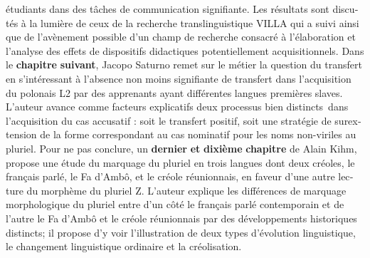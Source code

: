 \documentclass[output=paper]{langscibook}
\begin{document}
\begin{otherlanguage}{french}
étudiants dans des tâches de communication signifiante. Les résultats sont discutés à la lumière de ceux de la recherche translinguistique VILLA qui a suivi ainsi que de l’avènement possible d’un champ de recherche consacré à l’élaboration et l’analyse des effets de dispositifs didactiques potentiellement acquisitionnels. Dans le {\textbf{chapitre} \textbf{suivant}}, Jacopo Saturno remet sur le métier la question du transfert en s’intéressant à l’absence non moins signifiante de transfert dans l’acquisition du polonais L2 par des apprenants ayant différentes langues premières slaves.  {L’auteur avance} comme facteurs explicatifs deux processus bien distincts~dans l’acquisition du cas accusatif : soit le transfert positif, soit une stratégie de surextension de la forme correspondant au cas nominatif pour les noms non-viriles au pluriel.
Pour ne pas conclure, un {\textbf{dernier} \textbf{et} \textbf{dixième} \textbf{chapitre}} de Alain Kihm, propose une étude du marquage du pluriel en trois langues dont deux créoles, le français parlé, le Fa d’Ambô, et le créole réunionnais, en faveur d’une autre lecture du morphème du pluriel Z. L’auteur explique les différences de marquage morphologique du pluriel entre d'un côté le français parlé contemporain et de l'autre le Fa d’Ambô et le créole réunionnais par des développements historiques distincts; il propose d'y voir l'illustration de deux types d'évolution linguistique, le changement linguistique ordinaire et la créolisation.

\printbibliography[heading=subbibliography,notkeyword=this]
\end{otherlanguage}
\end{document}

